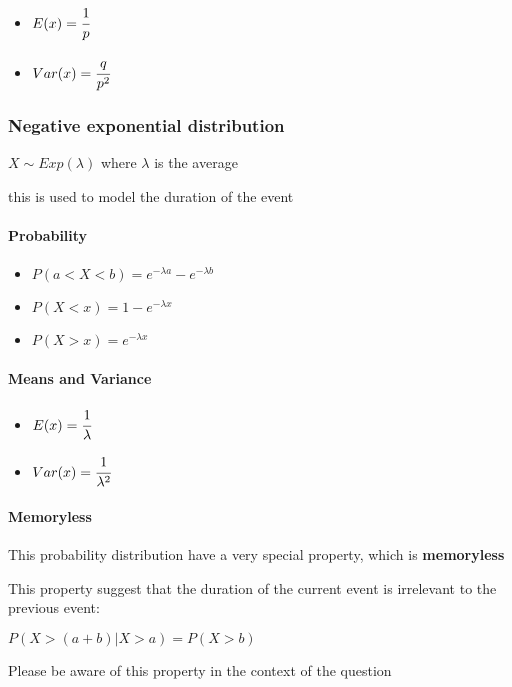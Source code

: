 \documentclass[]{article}
\let\oldparagraph\paragraph
\renewcommand{\paragraph}[1]{\oldparagraph{#1}\mbox{}}
\begin{document}
\begin{itemize}
\item
  \(E(x) = \cfrac{1}{p}\)
\item
  \(Var(x) = \cfrac{q}{p^2}\)
\end{itemize}

\subsubsection{Negative exponential distribution}\label{header-n132}

\(X\sim Exp(\lambda)\) where \(\lambda\) is the average

this is used to model the duration of the event

\paragraph{Probability}\label{header-n135}

\begin{itemize}
\item
  \(P(a<X<b) = e^{-\lambda a} - e^{-\lambda b}\)
\item
  \(P(X<x) = 1-e^{-\lambda x}\)
\item
  \(P(X > x) = e^{-\lambda x}\)
\end{itemize}

\paragraph{Means and Variance}\label{header-n143}

\begin{itemize}
\item
  \(E(x) = \cfrac{1}{\lambda}\)
\item
  \(Var(x) =  \cfrac{1}{\lambda^2}\)
\end{itemize}

\paragraph{Memoryless}\label{header-n149}

This probability distribution have a very special property, which is
\textbf{memoryless}

This property suggest that the duration of the current event is
irrelevant to the previous event:

\(P(X>(a+b)|X>a) = P(X>b)\)

Please be aware of this property in the context of the question
\end{document}
